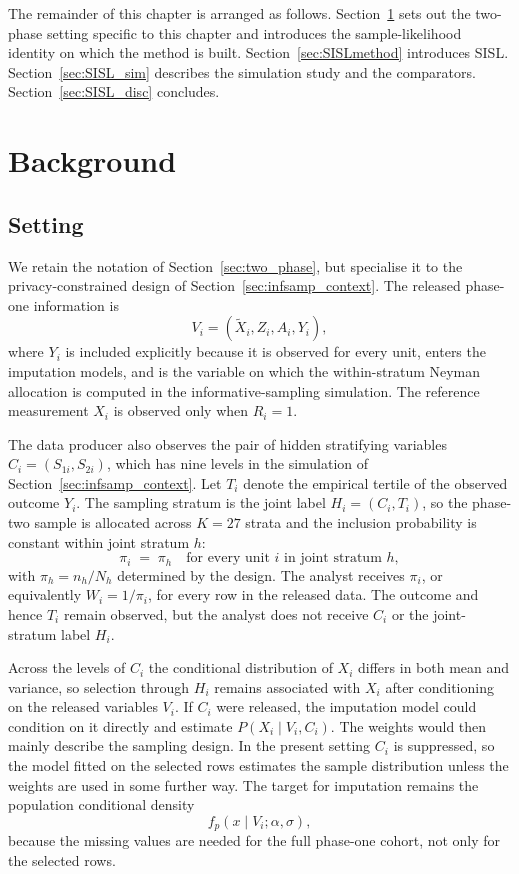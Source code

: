 The remainder of this chapter is arranged as follows. Section~\ref{sec:SISL_background} sets out the two-phase setting specific to this chapter and introduces the sample-likelihood identity on which the method is built. Section~\ref{sec:SISLmethod} introduces SISL. Section~\ref{sec:SISL_sim} describes the simulation study and the comparators. Section~\ref{sec:SISL_disc} concludes.
 
 
\section{Background}
\label{sec:SISL_background}
 
\subsection{Setting}
\label{sec:SISL_background_setting}
 
We retain the notation of Section~\ref{sec:two_phase}, but specialise it to the privacy-constrained design of Section~\ref{sec:infsamp_context}. The released phase-one information is
\[
V_i = (\tilde{X}_i,Z_i,A_i,Y_i),
\]
where $Y_i$ is included explicitly because it is observed for every unit, enters the imputation models, and is the variable on which the within-stratum Neyman allocation is computed in the informative-sampling simulation. The reference measurement $X_i$ is observed only when $R_i=1$.

The data producer also observes the pair of hidden stratifying variables $C_i=(S_{1i},S_{2i})$, which has nine levels in the simulation of Section~\ref{sec:infsamp_context}. Let $T_i$ denote the empirical tertile of the observed outcome $Y_i$. The sampling stratum is the joint label $H_i=(C_i,T_i)$, so the phase-two sample is allocated across $K=27$ strata and the inclusion probability is constant within joint stratum $h$:
\begin{equation}
\pi_i \;=\; \pi_h \quad \text{for every unit } i \text{ in joint stratum } h,
\label{eq:SISL_piecewise}
\end{equation}
with $\pi_h=n_h/N_h$ determined by the design. The analyst receives $\pi_i$, or equivalently $W_i=1/\pi_i$, for every row in the released data. The outcome and hence $T_i$ remain observed, but the analyst does not receive $C_i$ or the joint-stratum label $H_i$.

Across the levels of $C_i$ the conditional distribution of $X_i$ differs in both mean and variance, so selection through $H_i$ remains associated with $X_i$ after conditioning on the released variables $V_i$. If $C_i$ were released, the imputation model could condition on it directly and estimate $P(X_i\mid V_i,C_i)$. The weights would then mainly describe the sampling design. In the present setting $C_i$ is suppressed, so the model fitted on the selected rows estimates the sample distribution unless the weights are used in some further way. The target for imputation remains the population conditional density
\[
f_p(x\mid V_i;\alpha,\sigma),
\]
because the missing values are needed for the full phase-one cohort, not only for the selected rows.
 
